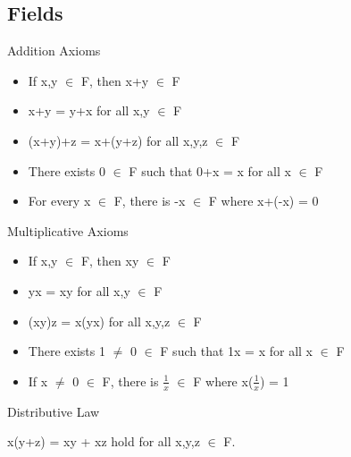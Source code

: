 \subsection{Fields}

Addition Axioms
	\begin{itemize}[leftmargin=1cm, itemsep=0.1cm]
		\item If x,y $\in$ F, then x+y $\in$ F
	
		\item x+y = y+x for all x,y $\in$ F
	
		\item (x+y)+z = x+(y+z) for all x,y,z $\in$ F
	
		\item There exists 0 $\in$ F such that 0+x = x for all x $\in$ F
	
		\item For every x $\in$ F, there is -x $\in$ F where x+(-x) = 0
	\end{itemize}

Multiplicative Axioms
	\begin{itemize}[leftmargin=1cm, itemsep=0.1cm]
		\item If x,y $\in$ F, then xy $\in$ F
	
		\item yx = xy for all x,y $\in$ F
	
		\item (xy)z = x(yx) for all x,y,z $\in$ F
	
		\item There exists 1 $\not =$ 0 $\in$ F such that 1x = x for all x $\in$ F
	
		\item If x $\not =$ 0 $\in$ F, there is $\frac{1}{x}$ $\in$ F where x($\frac{1}{x}$) = 1
	\end{itemize}

Distributive Law

	\qquad x(y+z) = xy + xz hold for all x,y,z $\in$ F. \\

